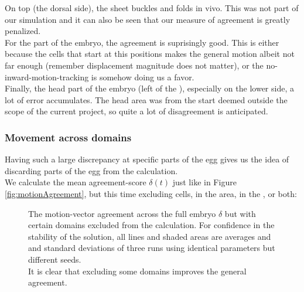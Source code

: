 On top (the dorsal side), the sheet buckles and folds in vivo. This was not part of our simulation and it can also be seen that our measure of agreement is greatly penalized.\\

For the  part of the embryo, the agreement is suprisingly good. This is either because the cells that start at this positions makes the general motion albeit not far enough (remember displacement magnitude does not matter), or the no-inward-motion-tracking is somehow doing us a favor.\reph\\


Finally, the head part of the embryo (left of the ), especially on the lower side, a lot of error accumulates. The head area was from the start deemed outside the scope of the current project, so quite a lot of disagreement is anticipated.\\


\subsubsection{Movement across domains}
Having such a large discrepancy at specific parts of the egg gives us the idea of discarding parts of the egg from the calculation.\\


We calculate the mean agreement-score $\delta(t)$ just like in Figure \ref{fig:motionAgreement}, but this time excluding cells, in the  area, in the , or both:



\begin{figure}[H]
    \centering
    \caption{The motion-vector agreement across the full embryo $\delta$ but with certain domains excluded from the calculation. For confidence in the stability of the solution, all lines and shaded areas are averages and and standard deviations of three runs using identical parameters but different seeds.\\It is clear that excluding some domains improves the general agreement.}
    \label{fig:vector-subsets}
\end{figure}

